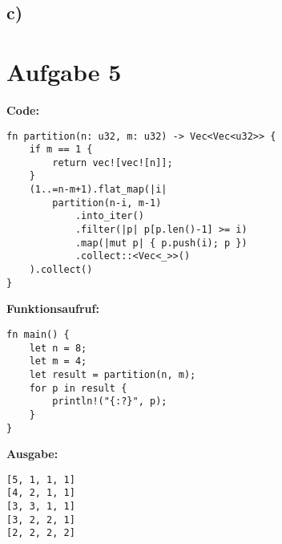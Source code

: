 \documentclass[a4paper]{scrartcl}
\begin{document}
\subsection*{c)}

\newpage
\section*{Aufgabe 5}
\textbf{Code:}
\begin{lstlisting}
fn partition(n: u32, m: u32) -> Vec<Vec<u32>> {
    if m == 1 {
        return vec![vec![n]];
    }
    (1..=n-m+1).flat_map(|i| 
        partition(n-i, m-1)
            .into_iter()
            .filter(|p| p[p.len()-1] >= i)
            .map(|mut p| { p.push(i); p })
            .collect::<Vec<_>>()
    ).collect()
}
\end{lstlisting}
\textbf{Funktionsaufruf:}
\begin{lstlisting}
fn main() {
    let n = 8;
    let m = 4;
    let result = partition(n, m);
    for p in result {
        println!("{:?}", p);
    }
}
\end{lstlisting}

\textbf{Ausgabe:}
\begin{lstlisting}
[5, 1, 1, 1]
[4, 2, 1, 1]
[3, 3, 1, 1]
[3, 2, 2, 1]
[2, 2, 2, 2]
\end{lstlisting}
\end{document}
